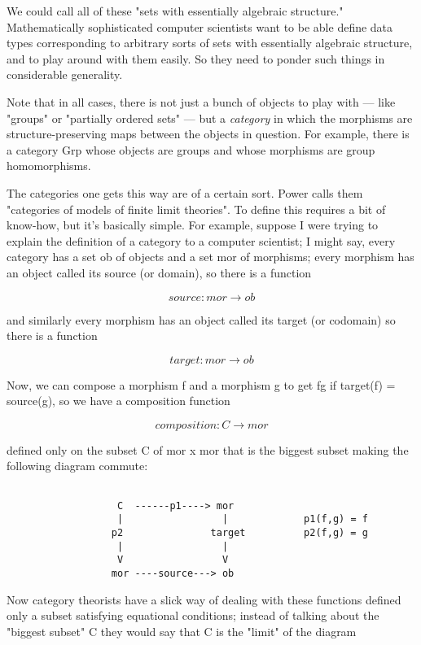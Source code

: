 We could call all of these "sets with essentially algebraic structure." 
Mathematically sophisticated computer scientists want to be able 
define data types corresponding to arbitrary sorts of sets with 
essentially algebraic structure, and to play around with them easily.  
So they need to ponder such things in considerable generality.

Note that in all cases, there is not just a bunch of objects to play with ---
like "groups" or "partially ordered sets" --- but a \emph{category} in which 
the morphisms are structure-preserving maps between the objects in question.  
For example, there is a category Grp whose objects are groups and whose 
morphisms are group homomorphisms.  

The categories one gets this way are of a certain sort.  Power calls 
them "categories of models of finite limit theories".  To define this 
requires a bit of know-how, but it's basically simple.  For example, suppose
I were trying to explain the definition of a category to a computer
scientist; I might say, every category has a set ob of objects
and a set mor of morphisms; every morphism has an object called
its source (or domain), so there is a function


$$

                  source: mor \to  ob
$$
    

and similarly every morphism has an object called its target
(or codomain) so there is a function


$$

                  target: mor \to  ob
$$
    

Now, we can compose a morphism f and a morphism g to get fg
if target(f) = source(g), so we have a composition function


$$

              composition: C \to  mor
$$
    

defined only on the subset C of mor x mor that is the biggest
subset making the following diagram commute:


\begin{verbatim}

                   C  ------p1----> mor
                   |                 |             p1(f,g) = f
                  p2               target          p2(f,g) = g
                   |                 |
                   V                 V
                  mor ----source---> ob 
\end{verbatim}
    

Now category theorists have a slick way of dealing with these
functions defined only a subset satisfying equational conditions;
instead of talking about the "biggest subset" C they would say
that C is the "limit" of the diagram 


